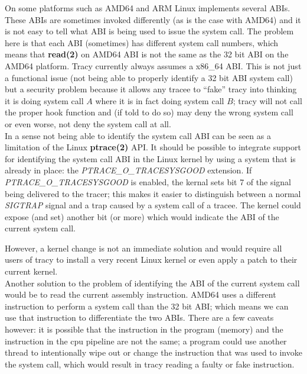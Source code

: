 \documentclass[a4paper, 10pt]{report}
\begin{document}
On some platforms such as AMD64 and ARM Linux implements several ABIs.
These ABIs are sometimes invoked differently (as is the case with AMD64)
and it is not easy to tell what ABI is being used to issue the system call.
The problem here is that each ABI (sometimes) has different system call
numbers, which means that \textbf{read(2)} on AMD64 ABI is not the same
as the 32 bit ABI on the AMD64 platform. Tracy currently always assumes
a x86\_64 ABI. This is not just a functional issue (not being able to
properly identify a 32 bit ABI system call) but a security problem because it
allows any tracee to ``fake'' tracy into thinking it is doing system call $A$
where it is in fact doing system call $B$; tracy will not call the proper hook
function and (if told to do so) may deny the wrong system call or even worse,
not deny the system call at all. \\

In a sense not being able to identify the system call ABI can be seen as a
limitation of the Linux \textbf{ptrace(2)} API. It should be possible to
integrate support for identifying the system call ABI in the Linux kernel
by using a system that is already in place: the \textit{PTRACE\_O\_TRACESYSGOOD}
extension. If \textit{PTRACE\_O\_TRACESYSGOOD} is enabled, the kernal sets bit 7
of the signal being delivered to the tracer; this makes it easier to distinguish
between a normal \textit{SIGTRAP} signal and a trap caused by a system call of
a tracee. The kernel could expose (and set) another bit (or more) which would
indicate the ABI of the current system call.

However, a kernel change is not an immediate solution and would require all
users of tracy to install a very recent Linux kernel or even apply a patch
to their current kernel. \\

Another solution to the problem of identifying the ABI of the current
system call would be to read the current assembly instruction. AMD64 uses a
different instruction to perform a system call than the 32 bit ABI; which
means we can use that instruction to differentiate the two ABIs. There are a
few caveats however: it is possible that the instruction in the program (memory)
and the instruction in the cpu pipeline are not the same; a program could use
another thread to intentionally wipe out or change the instruction that was
used to invoke the system call, which would result in tracy reading a faulty
or fake instruction. \\
\end{document}
